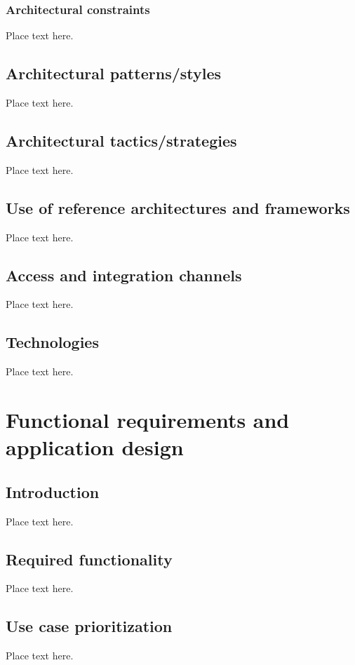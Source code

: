 \documentclass[12pt]{article}
\begin{document}
			   	\subsubsection{Architectural constraints}	
						Place text here.					    	    
		\subsection{Architectural patterns/styles}	
			    Place text here.	    	    
			    
		\subsection{Architectural tactics/strategies}	
					    Place text here.
					    
		\subsection{Use of reference architectures and frameworks}	
					    Place text here.
					    
		\subsection{Access and integration channels}	
					    Place text here.	
		
		\subsection{Technologies}	
					    Place text here.	
					    		    		    			    	
	\section{Functional requirements and application design}
		\subsection{Introduction}	
					    Place text here.
					    
		\subsection{Required functionality}	
					    Place text here.
					    
		\subsection{Use case prioritization}	
						Place text here.
		
\end{document}
